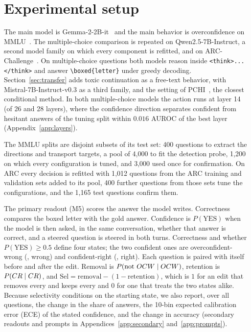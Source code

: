 \section{Experimental setup}
\label{sec:exp}\label{sec:data}

The main model is Gemma-2-2B-it~\citep{gemma2024} and the main behavior is
overconfidence on MMLU~\citep{hendrycks2021mmlu}. The multiple-choice
comparison is repeated on Qwen2.5-7B-Instruct, a second model family on which
every component is refitted, and on ARC-Challenge~\citep{clark2018arc}. On
multiple-choice questions both models reason inside
\texttt{<think>...</think>} and answer \verb|\boxed{letter}| under greedy
decoding. Section~\ref{sec:transfer} adds toxic continuation as a
free-text behavior, with Mistral-7B-Instruct-v0.3 as a third family, and the
setting of PCHI~\citep{liu2026probe}, the closest conditional method. In both
multiple-choice models the action runs at layer 14 (of 26 and 28 layers),
where the confidence direction separates confident from hesitant answers of the
tuning split within $0.016$ AUROC of the best layer
(Appendix~\ref{app:layers}).

The MMLU splits are disjoint subsets of its test set: 400 questions to extract
the directions and transport targets, a pool of 4{,}000 to fit the detection
probe, 1{,}200 on which every configuration is tuned, and 3{,}000 used once for
confirmation. On ARC every decision is refitted with 1{,}012 questions from the
ARC training and validation sets added to its pool, 400 further questions from
those sets tune the configurations, and the 1{,}165 test questions confirm
them.

The primary readout (M5) scores the answer the model writes. Correctness
compares the boxed letter with the gold answer. Confidence is
$P(\mathrm{YES})$ when the model is then asked, in the same conversation,
whether that answer is correct, and a steered question is steered in both
turns. Correctness and whether $P(\mathrm{YES})\ge0.5$ define four states;
the two confident ones are overconfident-wrong (\ocw{}, wrong) and
confident-right (\crok{}, right). Each question is paired with itself before
and after the edit. Removal is $P(\text{not }OCW\mid OCW)$, retention is
$P(CR\mid CR)$, and $\mathrm{Sel}=\text{removal}-(1-\text{retention})$,
which is $1$ for an edit that removes every \ocw{} and keeps every \crok{} and
$0$ for one that treats the two states alike. Because selectivity conditions on
the starting state, we also report, over all questions, the change in the share
of \ocw{} answers, the 10-bin expected calibration error (ECE) of the stated
confidence, and the change in accuracy (secondary readouts and prompts in
Appendices~\ref{app:secondary} and~\ref{app:prompts}).

